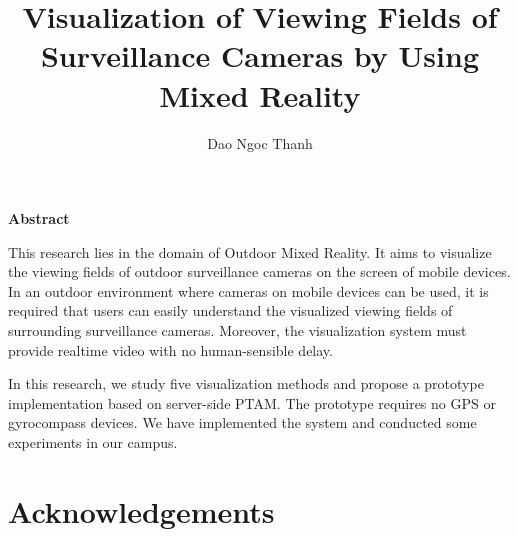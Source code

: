 \documentclass[a4paper,11pt]{report}
\title{Visualization of Viewing Fields of Surveillance Cameras by Using Mixed Reality}
\author{Dao Ngoc Thanh}
\begin{document}
\maketitle
\thispagestyle{empty}
\newpage

\thispagestyle{empty}
\vspace*{20pt plus 1fil}
\noindent
\begin{center}
{\bf Abstract}
\vspace{5mm}
\end{center}
This research lies in the domain of Outdoor Mixed Reality. It aims to visualize the viewing fields of outdoor surveillance cameras on the screen of mobile devices. In an outdoor environment where cameras on mobile devices can be used, it is required that users can easily understand the visualized viewing fields of surrounding surveillance cameras. Moreover, the visualization system must provide realtime video with no human-sensible delay.

In this research, we study five visualization methods and propose a prototype implementation based on server-side PTAM. The prototype requires no GPS or gyrocompass devices. We have implemented the system and conducted some experiments in our campus.

\par
\vspace{0pt plus 1fil}
\newpage

\tableofcontents
\listoffigures

\pagebreak \setcounter{page}{1}







\chapter*{Acknowledgements}

\newpage

\appendix %






\renewcommand{\bibname}{Bibliography}

%

\end{document}
